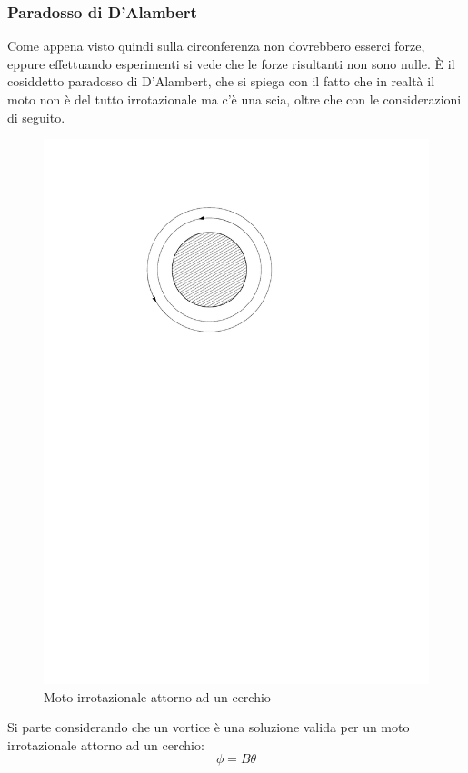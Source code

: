 \subsubsection{Paradosso di D'Alambert}
Come appena visto quindi sulla circonferenza non dovrebbero esserci forze, eppure effettuando esperimenti si vede che le forze risultanti non sono nulle.
È il cosiddetto paradosso di D'Alambert, che si spiega con il fatto che in realtà il moto non è del tutto irrotazionale ma c'è una scia, oltre che con le considerazioni di seguito.
%
	\begin{figure}[ht]
		\includegraphics[scale=0.7]{./7.3 Flusso irrotazionale/7.3-7}
		\centering
		\caption{Moto irrotazionale attorno ad un cerchio}
	\end{figure}
%
Si parte considerando che un vortice è una soluzione valida per un moto irrotazionale attorno ad un cerchio:
%
	\begin{equation*}
		\phi = B \theta
	\end{equation*}
